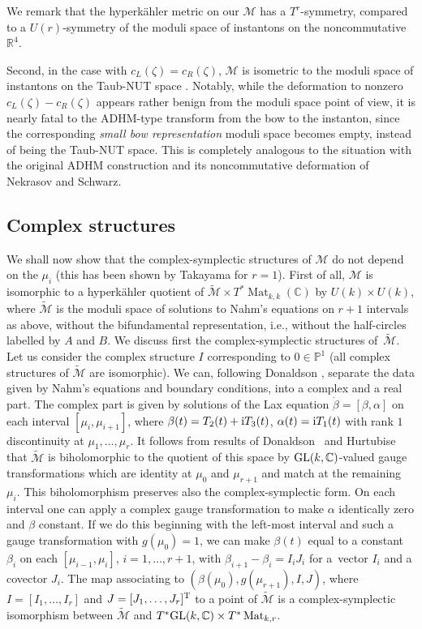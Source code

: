 \documentclass[10pt,a4paper]{amsart}
\newcommand{\cx}{{\mathbb C}}
\newcommand{\Mat}{\operatorname{Mat}}
\numberwithin{equation}{section}
\newcommand{\oP}{{\mathbb{P}}}
\newcommand{\sM}{{\mathcal{M}}} %
\begin{document}
{We remark that the hyperk\"ahler metric on our $\sM$ has a $T^r$-symmetry, compared to a $U(r)$-symmetry of the moduli space of instantons on the noncommutative $\mathbb{R}^4.$

Second, in the case with $c_L(\zeta)=c_R(\zeta)$, $\sM$ is isometric to the moduli space of instantons on the Taub-NUT space \cite{CLHS}. Notably, while the deformation to nonzero $c_L(\zeta)-c_R(\zeta)$ appears rather benign from the moduli space point of view, it is nearly fatal to the ADHM-type transform from the bow to the instanton, since the corresponding {\em small bow representation} moduli space becomes empty, instead of being the Taub-NUT space. This is completely analogous to the situation with the original ADHM construction and its noncommutative deformation of Nekrasov and Schwarz.

\subsection{Complex structures\label{complex}}
We shall now show that the complex-symplectic structures of $\sM$ do not depend on the $\mu_i$ (this has been shown by Takayama for $r=1$). First of all, $\sM$ is isomorphic to a hyperk\"ahler quotient of $\tilde \sM\times T^\ast \Mat_{k,k}(\cx)$ by $U(k)\times U(k)$, where $\tilde\sM$ is the moduli space of solutions to Nahm's equations on $r+1$ intervals as above, without the bifundamental representation, i.e., without the half-circles labelled by $A$ and $B$. We discuss first the complex-symplectic structures of~$\tilde\sM$. Let us consider the complex structure $I$ corresponding to $0\in \oP^1$ (all complex structures of $\tilde\sM$ are isomorphic). We can, following Donaldson \cite{Don}, separate the data given by Nahm's equations and boundary conditions, into a complex and a real part.
The complex part is given by solutions of the Lax equation $\dot\beta=[\beta,\alpha]$ on each interval {$[\mu_i,\mu_{i+1}]$}, where $\beta(t)=T_2(t)+{\rm i} T_3(t)$, $\alpha(t)={\rm i} T_1(t)$ with rank $1$ discontinuity at $\mu_1,\dots,\mu_r$.
It follows from results of Donaldson~\cite{Don} and Hurtubise~\cite{Hurt} that $\tilde\sM$ is biholomorphic to the quotient of this space by ${\rm GL}(k,\cx)$-valued gauge transformations which are identity at $\mu_0$ and $\mu_{r+1}$ and match at the remaining~$\mu_i$.
This biholomorphism preserves also the complex-symplectic form.
On each interval one can apply a complex gauge transformation to make $\alpha$ identically zero and $\beta$ constant. If we do this
beginning with the left-most interval and such a gauge transformation with $g(\mu_0)=1$, we can make $\beta(t)$ equal to a constant $\beta_i$ on each $[\mu_{i-1},\mu_i]$, $i=1,\dots, r+1$, with $\beta_{i+1}-\beta_i=I_iJ_i$ for a~vector $I_i$ and a covector $J_i$. The map associating to $(\beta(\mu_0),g(\mu_{r+1}), I,J)$, where $I=[I_1,\dots,I_r]$ and $J=[J_1,\dots, J_r]^{\rm T}$ to a point of $\tilde\sM$ is a complex-symplectic isomorphism between $\tilde\sM$ and $T^\ast {\rm GL}(k,\cx)\times T^\ast\Mat_{k,r}$.

}
\end{document}
